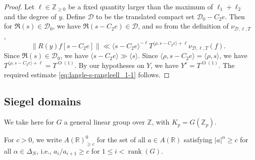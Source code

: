 \documentclass[reqno]{amsart}
\def\O{\operatorname{O}}
\DeclareMathOperator{\rank}{rank}
\theoremstyle{plain} \newtheorem{theorem} {Theorem}
\theoremstyle{definition} \newtheorem{definition} [theorem] {Definition}
\theoremstyle{itplain} %
\numberwithin{equation}{section}
\numberwithin{theorem}{section}
\renewcommand{\geq}{\geqslant}
\renewcommand{\leq}{\leqslant}
\begin{document}
\begin{proof}
Let $\ell \in \mathbb{Z}_{\geq 0}$ be a fixed quantity larger than the maximum of $\ell_1 + \ell_2$ and the degree of $y$.  Define $\mathcal{D}$ to be the translated compact set $\mathcal{D}_0 - C_2 e$.  Then for $\Re(s) \in \mathcal{D}_0$, we have $\Re(s - C_2 e) \in \mathcal{D}$, and so from the definition of $\nu_{\mathcal{D},\ell,T}$,
\begin{equation}\label{eq:ry-fs-c_2}
  \|R(y) f[s - C_2 e]\| \ll \langle s - C_2 e \rangle^{-\ell} T ^{\langle \rho, s - C_2 e \rangle + \ell} \nu_{\mathcal{D},\ell,T}(f).
\end{equation}
Since $\Re(s) \in \mathcal{D}_0$, we have $\langle s - C_2 e \rangle \gg \langle s \rangle$.  Since $\langle \rho, s - C_2 e \rangle = \langle \rho, s \rangle$, we have $T^{\langle \rho, s - C_2 e \rangle + \ell} = T^{\O(1)}$.  By our hypotheses on $Y$, we have $Y^s = T^{\O(1)}$.   The required estimate \eqref{eq:langle-s-rangleell_1-1} follows.
\end{proof}



\subsection{Siegel domains}\label{sec:siegel-domains}
We take here for $G$ a general linear group over $\mathbb{Z}$, with $K_p = G(\mathbb{Z}_p)$.

For $c > 0$, we write $A(\mathbb{R})^0_{\geq c}$ for the set of all $a \in A(\mathbb{R})$ satisfying $|a|^{\alpha} \geq c$ for all $\alpha \in \Delta_N$, i.e., $a_i/a_{i+1} \geq c$ for $1 \leq i < \rank(G)$.
\end{document}
